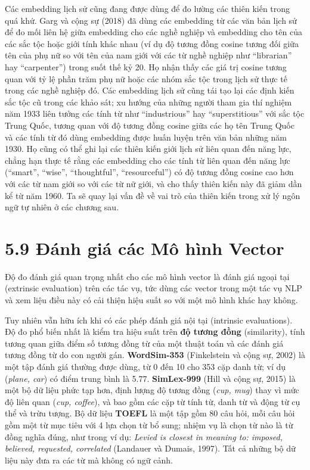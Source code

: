 Các embedding lịch sử cũng đang được dùng để đo lường các thiên kiến trong quá khứ. Garg và cộng sự (2018) đã dùng các embedding từ các văn bản lịch sử để đo mối liên hệ giữa embedding cho các nghề nghiệp và embedding cho tên của các sắc tộc hoặc giới tính khác nhau (ví dụ độ tương đồng cosine tương đối giữa tên của phụ nữ so với tên của nam giới với các từ nghề nghiệp như ``librarian'' hay ``carpenter'') trong suốt thế kỷ 20. Họ nhận thấy các giá trị cosine tương quan với tỷ lệ phần trăm phụ nữ hoặc các nhóm sắc tộc trong lịch sử thực tế trong các nghề nghiệp đó. Các embedding lịch sử cũng tái tạo lại các định kiến sắc tộc cũ trong các khảo sát; xu hướng của những người tham gia thí nghiệm năm 1933 liên tưởng các tính từ như ``industrious'' hay ``superstitious'' với sắc tộc Trung Quốc, tương quan với độ tương đồng cosine giữa các họ tên Trung Quốc và các tính từ đó dùng embedding được huấn luyện trên văn bản những năm 1930. Họ cũng có thể ghi lại các thiên kiến giới lịch sử liên quan đến năng lực, chẳng hạn thực tế rằng các embedding cho các tính từ liên quan đến năng lực (``smart'', ``wise'', ``thoughtful'', ``resourceful'') có độ tương đồng cosine cao hơn với các từ nam giới so với các từ nữ giới, và cho thấy thiên kiến này đã giảm dần kể từ năm 1960. Ta sẽ quay lại vấn đề về vai trò của thiên kiến trong xử lý ngôn ngữ tự nhiên ở các chương sau.

\section{5.9 Đánh giá các Mô hình Vector}

Độ đo đánh giá quan trọng nhất cho các mô hình vector là đánh giá ngoại tại (extrinsic evaluation) trên các tác vụ, tức dùng các vector trong một tác vụ NLP và xem liệu điều này có cải thiện hiệu suất so với một mô hình khác hay không.

Tuy nhiên vẫn hữu ích khi có các phép đánh giá nội tại (intrinsic evaluations). Độ đo phổ biến nhất là kiểm tra hiệu suất trên \textbf{độ tương đồng} (similarity), tính tương quan giữa điểm số tương đồng từ của một thuật toán và các đánh giá tương đồng từ do con người gán. \textbf{WordSim-353} (Finkelstein và cộng sự, 2002) là một tập đánh giá thường được dùng, từ 0 đến 10 cho 353 cặp danh từ; ví dụ (\emph{plane, car}) có điểm trung bình là 5.77. \textbf{SimLex-999} (Hill và cộng sự, 2015) là một bộ dữ liệu phức tạp hơn, định lượng độ tương đồng (\emph{cup, mug}) thay vì mức độ liên quan (\emph{cup, coffee}), và bao gồm các cặp từ tính từ, danh từ và động từ cụ thể và trừu tượng. Bộ dữ liệu \textbf{TOEFL} là một tập gồm 80 câu hỏi, mỗi câu hỏi gồm một từ mục tiêu với 4 lựa chọn từ bổ sung; nhiệm vụ là chọn từ nào là từ đồng nghĩa đúng, như trong ví dụ: \emph{Levied is closest in meaning to: imposed, believed, requested, correlated} (Landauer và Dumais, 1997). Tất cả những bộ dữ liệu này đưa ra các từ mà không có ngữ cảnh.

